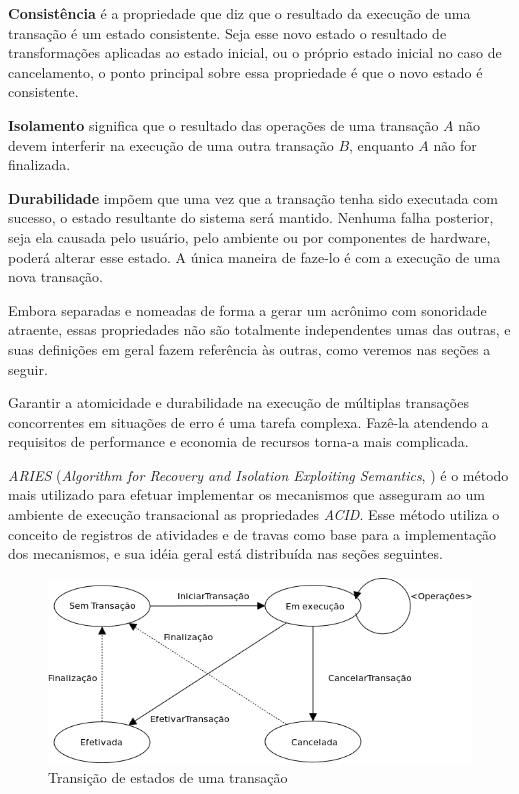 \documentclass[11pt,twoside,a4paper]{book}
\begin{document}
\textbf{Consistência} é a propriedade que diz que o resultado da execução de uma transação é um estado consistente. Seja esse novo estado o resultado de transformações aplicadas ao estado inicial, ou o próprio estado inicial no caso de cancelamento, o ponto principal sobre essa propriedade é que o novo estado é consistente.

\textbf{Isolamento} significa que o resultado das operações de uma transação $A$ não devem interferir na execução de uma outra transação $B$, enquanto $A$ não for finalizada.

\textbf{Durabilidade} impõem que uma vez que a transação tenha sido executada com sucesso, o estado resultante do sistema será mantido. Nenhuma falha posterior, seja ela causada pelo usuário, pelo ambiente ou por componentes de hardware, poderá alterar esse estado. A única maneira de faze-lo é com a execução de uma nova transação.

Embora separadas e nomeadas de forma a gerar um acrônimo com sonoridade atraente, essas propriedades não são totalmente independentes umas das outras, e suas definições em geral fazem referência às outras, como veremos nas seções a seguir.

Garantir a atomicidade e durabilidade na execução de múltiplas transações concorrentes em situações de erro é uma tarefa complexa. Fazê-la atendendo a requisitos de performance e economia de recursos torna-a mais complicada. 

\emph{ARIES} (\emph{Algorithm for Recovery and Isolation Exploiting Semantics}, \cite{aries}) é o método mais utilizado para efetuar implementar os mecanismos que asseguram ao um ambiente de execução transacional as propriedades \emph{ACID}. Esse método utiliza o conceito de registros de atividades e de travas como base para a implementação dos mecanismos, e sua idéia geral está distribuída nas seções seguintes.

\begin{figure}
  \centering
  \includegraphics[width=\textwidth]{transicao_estado} 
  \caption{Transição de estados de uma transação}
  \label{fig:transicao_estado} 
\end{figure}
\end{document}
